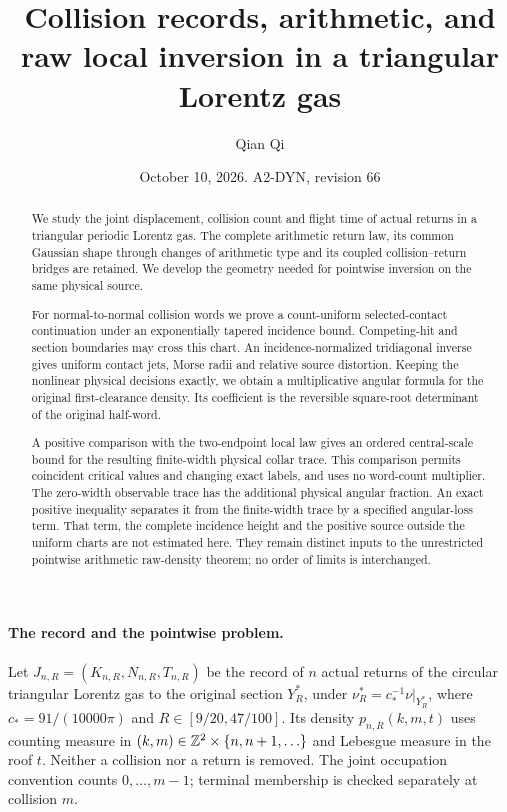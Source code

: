 \documentclass[11pt,reqno]{amsart}
\title[Collision records and raw local inversion]{Collision records, arithmetic, and raw local inversion in a triangular Lorentz gas}
\author{Qian Qi}
\date{October 10, 2026. A2-DYN, revision 66}
\numberwithin{equation}{section}
\theoremstyle{definition}\newtheorem{definition}[theorem]{Definition}
\theoremstyle{remark}\newtheorem{remark}[theorem]{Remark}
\begin{document}
\raggedbottom
\begin{abstract}
We study the joint displacement, collision count and flight time of
actual returns in a triangular periodic Lorentz gas. The complete
arithmetic return law, its common Gaussian shape through changes of
arithmetic type and its coupled collision--return bridges are retained.
We develop the geometry needed for pointwise inversion on the same
physical source.

For normal-to-normal collision words we prove a count-uniform
selected-contact continuation under an exponentially tapered incidence
bound. Competing-hit and section boundaries may cross this chart.
An incidence-normalized tridiagonal inverse gives uniform contact jets,
Morse radii and relative source distortion. Keeping the nonlinear
physical decisions exactly, we obtain a multiplicative angular formula
for the original first-clearance density. Its coefficient is the
reversible square-root determinant of the original half-word.

A positive comparison with the two-endpoint local law gives an ordered
central-scale bound for the resulting finite-width physical collar
trace. This comparison permits coincident critical values and changing
exact labels, and uses no word-count multiplier. The zero-width
observable trace has the additional physical angular fraction. An exact
positive inequality separates it from the finite-width trace by a
specified angular-loss term. That term, the complete incidence height
and the positive source outside the uniform charts are not estimated
here. They remain distinct inputs to the unrestricted pointwise
arithmetic raw-density theorem; no order of limits is interchanged.
\end{abstract}
\maketitle

\paragraph{The record and the pointwise problem.}
Let $J_{n,R}=(K_{n,R},N_{n,R},T_{n,R})$ be the record of $n$ actual
returns of the circular triangular Lorentz gas to the original section
$Y_R^*$, under $\nu_R^*=c_*^{-1}\nu|_{Y_R^*}$, where
$c_*=91/(10000\pi)$ and $R\in[9/20,47/100]$. Its density
$p_{n,R}(k,m,t)$ uses counting measure in $(k,m)\in\mathbb Z^2\times\{n,n+1,\ldots\}$
and Lebesgue measure in the roof $t$. Neither a collision nor a return
is removed. The joint occupation convention counts $0,\ldots,m-1$;
terminal membership is checked separately at collision $m$.
\end{document}
